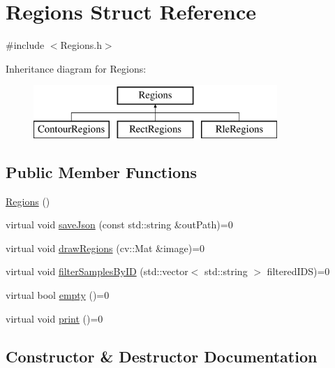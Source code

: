 \hypertarget{struct_regions}{}\section{Regions Struct Reference}
\label{struct_regions}


{\ttfamily \#include $<$Regions.\+h$>$}

Inheritance diagram for Regions\+:\begin{figure}[H]
\begin{center}
\leavevmode
\includegraphics[height=2.000000cm]{struct_regions}
\end{center}
\end{figure}
\subsection*{Public Member Functions}
\begin{DoxyCompactItemize}
\item 
\hyperlink{struct_regions_aa3456e0ecf9b3a84be6a0b7705495929}{Regions} ()
\item 
virtual void \hyperlink{struct_regions_a402078d4ff67e4aee31b231c2d1942c6}{save\+Json} (const std\+::string \&out\+Path)=0
\item 
virtual void \hyperlink{struct_regions_adab32a2a00fc77abb6f4876939dc8505}{draw\+Regions} (cv\+::\+Mat \&image)=0
\item 
virtual void \hyperlink{struct_regions_ae2bcea2b1c245a9d1ab1ff3abc23f2a0}{filter\+Samples\+By\+ID} (std\+::vector$<$ std\+::string $>$ filtered\+I\+DS)=0
\item 
virtual bool \hyperlink{struct_regions_a5763d0526981f665356ac35734e8e505}{empty} ()=0
\item 
virtual void \hyperlink{struct_regions_a5a19f40bc0d2226f244625b88fbf8e59}{print} ()=0
\end{DoxyCompactItemize}


\subsection{Constructor \& Destructor Documentation}
\mbox{\label{struct_regions_aa3456e0ecf9b3a84be6a0b7705495929}} 
